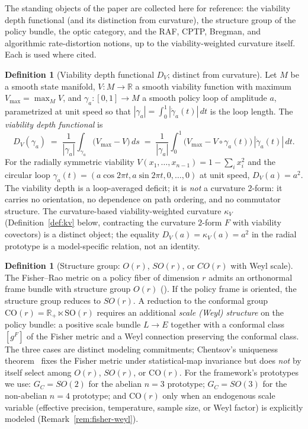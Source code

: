 \documentclass[11pt,a4paper]{article}
\theoremstyle{plain}
\theoremstyle{definition}
\newtheorem{definition}[theorem]{Definition}
\theoremstyle{remark}
\newcommand{\kk}{\kappa_{\!V}}
\newcommand{\RR}{\mathbb{R}}
\newcommand{\SO}{\mathrm{SO}}
\newcommand{\CO}{\mathrm{CO}}
\begin{document}
The standing objects of the paper are collected here for reference:
the viability depth functional (and its distinction from curvature),
the structure group of the policy bundle, the optic category, and
the RAF, CPTP, Bregman, and algorithmic rate-distortion notions, up
to the viability-weighted curvature itself. Each is used where cited.

\begin{definition}[Viability depth functional $D_V$; distinct from curvature]
\label{def:kappa-depth}
Let $M$ be a smooth state manifold, $V:M\to\RR$ a smooth viability
function with maximum $V_{\max}=\max_M V$, and $\gamma_a:[0,1]\to M$ a
smooth policy loop of amplitude $a$, parametrized at unit speed so that
$|\gamma_a| = \int_0^1|\dot\gamma_a(t)|\,dt$ is the loop length. The
\emph{viability depth functional} is
\begin{equation}\label{eq:DV}
  D_V(\gamma_a) \;=\; \frac{1}{|\gamma_a|}\int_{\gamma_a}\!\bigl(V_{\max}-V\bigr)\,ds
  \;=\; \frac{1}{|\gamma_a|}\int_0^1\!\bigl(V_{\max}-V\circ\gamma_a(t)\bigr)\,|\dot\gamma_a(t)|\,dt.
\end{equation}
For the radially symmetric viability $V(x_1,\ldots,x_{n-1}) = 1 - \sum_i
x_i^2$ and the circular loop $\gamma_a(t) = (a\cos 2\pi t, a\sin 2\pi t,
0,\ldots,0)$ at unit speed, $D_V(a) = a^2$. The viability depth is a
loop-averaged deficit; it is \emph{not} a curvature 2-form: it carries
no orientation, no dependence on path ordering, and no commutator
structure. The curvature-based viability-weighted curvature $\kk$
(Definition~\ref{def:kv} below, contracting the curvature
$2$-form $F$ with viability covectors) is a distinct object; the
equality $D_V(a) = \kk(a) = a^2$ in the radial prototype is a
model-specific relation, not an identity.
\end{definition}

\begin{definition}[Structure group: $O(r)$, $SO(r)$, or $CO(r)$ with Weyl scale]
\label{def:struct}
The Fisher--Rao metric on a policy fiber of dimension $r$ admits an
orthonormal frame bundle with structure group $O(r)$
(\cite{kobayashinomizu1969,amari2000}). If the policy frame is
oriented, the structure group reduces to $SO(r)$. A reduction to the
conformal group $\CO(r) = \RR_+ \ltimes \SO(r)$ requires an additional
\emph{scale (Weyl) structure} on the policy bundle: a positive scale
bundle $L \to E$ together with a conformal class $[g^F]$ of the
Fisher metric and a Weyl connection preserving the conformal class.
The three cases are distinct modeling commitments; Chentsov's
uniqueness theorem~\cite{chentsov1982} fixes the Fisher metric under
statistical-map invariance but does \emph{not} by itself select among
$O(r)$, $SO(r)$, or $\CO(r)$. For the framework's prototypes we use:
$G_C = SO(2)$ for the abelian $n=3$ prototype; $G_C = SO(3)$ for the
non-abelian $n=4$ prototype; and $\CO(r)$ only when an endogenous
scale variable (effective precision, temperature, sample size, or
Weyl factor) is explicitly modeled (Remark~\ref{rem:fisher-weyl}).
\end{definition}
\end{document}
